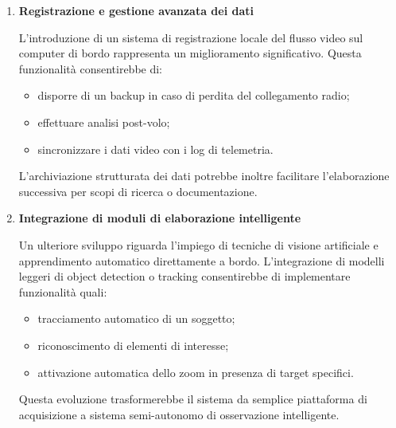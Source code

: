 \begin{enumerate}
Queste informazioni potrebbero essere utilizzate per:

\begin{itemize}
    \item monitorare con precisione l’orientamento effettivo della telecamera;
    \item registrare i dati insieme alla telemetria del velivolo;
    \item inviarli alla ground station tramite MAVLink.
\end{itemize}

In particolare, trasmettendo gli angoli reali del gimbal a QGroundControl,
sarebbe possibile visualizzare sulla mappa l’area inquadrata dalla telecamera
(footprint), migliorando la consapevolezza situazionale dell’operatore.

Nel complesso, l’adozione di ROS 2 renderebbe il sistema più ordinato,
più facilmente estendibile e meglio integrabile con altre componenti
robotiche, aprendo la strada a funzionalità autonome senza richiedere
una riprogettazione completa dell’architettura esistente.

\item \textbf{Registrazione e gestione avanzata dei dati}

L’introduzione di un sistema di registrazione locale del flusso video
sul computer di bordo rappresenta un miglioramento significativo.
Questa funzionalità consentirebbe di:
\begin{itemize}
    \item disporre di un backup in caso di perdita del collegamento radio;
    \item effettuare analisi post-volo;
    \item sincronizzare i dati video con i log di telemetria.
\end{itemize}
L’archiviazione strutturata dei dati potrebbe inoltre facilitare
l’elaborazione successiva per scopi di ricerca o documentazione.

\item \textbf{Integrazione di moduli di elaborazione intelligente}

Un ulteriore sviluppo riguarda l’impiego di tecniche di visione artificiale
e apprendimento automatico direttamente a bordo.
L’integrazione di modelli leggeri di object detection o tracking
consentirebbe di implementare funzionalità quali:
\begin{itemize}
    \item tracciamento automatico di un soggetto;
    \item riconoscimento di elementi di interesse;
    \item attivazione automatica dello zoom in presenza di target specifici.
\end{itemize}
Questa evoluzione trasformerebbe il sistema da semplice piattaforma
di acquisizione a sistema semi-autonomo di osservazione intelligente.


\end{enumerate}

